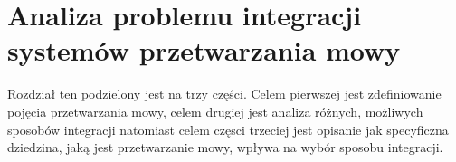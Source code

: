 
\chapter{Analiza problemu integracji systemów przetwarzania mowy} %



\ifpdf
    \graphicspath{{2/figures/PNG/}{2/figures/PDF/}{2/figures/}}
\else
    \graphicspath{{2/figures/EPS/}{2/figures/}}
\fi


Rozdział ten podzielony jest na trzy części. Celem pierwszej jest zdefiniowanie pojęcia przetwarzania mowy, celem drugiej jest analiza różnych, możliwych sposobów integracji natomiast celem częsci trzeciej jest opisanie jak specyficzna dziedzina, jaką jest przetwarzanie mowy, wpływa na wybór sposobu integracji.

